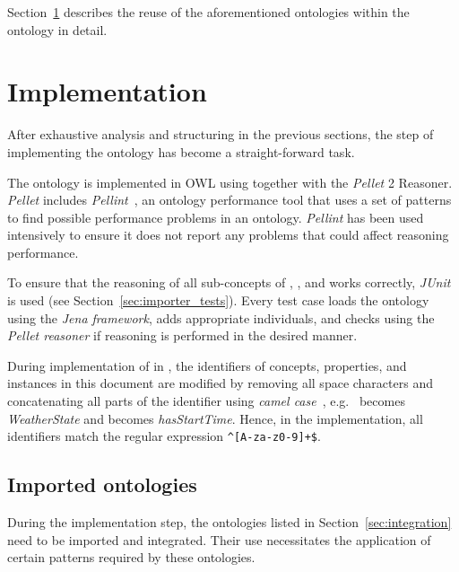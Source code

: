 Section~\ref{sec:implementation} describes the reuse of the aforementioned ontologies within the \smarthomeweather ontology in detail.

\section{Implementation}
\label{sec:implementation}

After exhaustive analysis and structuring in the previous sections, the step of implementing the ontology has become a straight-forward task.

The \smarthomeweather ontology is implemented in OWL using  together with the \emph{Pellet}  2 Reasoner. \emph{Pellet} includes \emph{Pellint}~\cite{pellint}, an ontology performance tool that uses a set of patterns to find possible performance problems in an  ontology. \emph{Pellint} has been used intensively to ensure it does not report any problems that could affect reasoning performance.

To ensure that the reasoning of all sub-concepts of , , and  works correctly, \emph{JUnit}~\cite{junit} is used (see Section~\ref{sec:importer_tests}). Every test case loads the \smarthomeweather ontology using the \emph{Jena framework}, adds appropriate individuals, and checks using the \emph{Pellet reasoner} if reasoning is performed in the desired manner.

During implementation of \smarthomeweather in , the identifiers of concepts, properties, and instances in this document are modified by removing all space characters and concatenating all parts of the identifier using \emph{camel case}~\cite{CamelCase}, e.g.\  becomes \emph{WeatherState} and  becomes \emph{hasStartTime}. Hence, in the  implementation, all identifiers match the regular expression \texttt{\textasciicircum[A-za-z0-9]+\$}.

\subsection{Imported ontologies}
\label{sec:ontology_imports}

During the implementation step, the ontologies listed in Section~\ref{sec:integration} need to be imported and integrated. Their use necessitates the application of certain patterns required by these ontologies.

